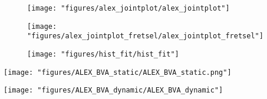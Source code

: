 

\begin{figure}
\begin{center}
\texttt{[image: "figures/alex\_jointplot/alex\_jointplot"]}
\caption[]{}
\end{center}
\end{figure}

\begin{figure}
\begin{center}
\texttt{[image: "figures/alex\_jointplot\_fretsel/alex\_jointplot\_fretsel"]}
\caption[]{}
\end{center}
\end{figure}



\begin{figure}
\begin{center}
\texttt{[image: "figures/hist\_fit/hist\_fit"]}
\caption[]{}
\end{center}
\end{figure}

\begin{figure*}
\begin{center}
\texttt{[image: "figures/ALEX\_BVA\_static/ALEX\_BVA\_static.png"]}
\caption[]{}
\end{center}
\end{figure*}

\begin{figure*}
\begin{center}
\texttt{[image: "figures/ALEX\_BVA\_dynamic/ALEX\_BVA\_dynamic"]}
\caption[]{}
\end{center}
\end{figure*}








\clearpage






